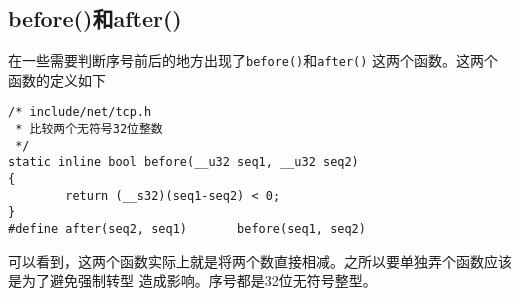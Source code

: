\subsection{before()和after()}
在一些需要判断序号前后的地方出现了\texttt{before()}和\texttt{after()}
这两个函数。这两个函数的定义如下
\begin{verbatim}
/* include/net/tcp.h
 * 比较两个无符号32位整数
 */
static inline bool before(__u32 seq1, __u32 seq2)
{
        return (__s32)(seq1-seq2) < 0;
}
#define after(seq2, seq1)       before(seq1, seq2)
\end{verbatim}
可以看到，这两个函数实际上就是将两个数直接相减。之所以要单独弄个函数应该是为了避免强制转型
造成影响。序号都是32位无符号整型。



